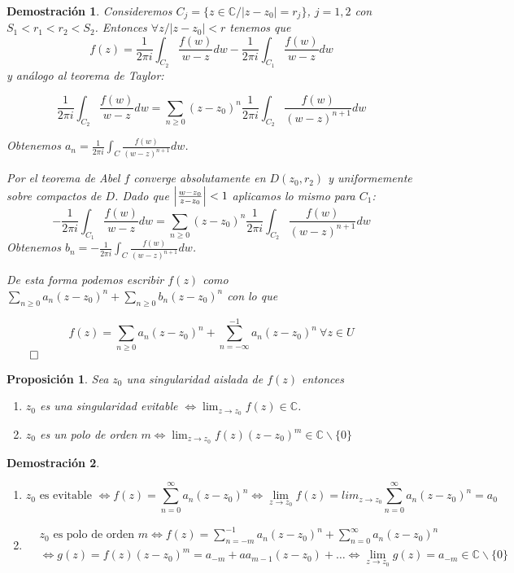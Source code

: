 \documentclass[10pt]{book}
\newtheorem{prop}{Proposición}[chapter]
\newtheorem*{dem}{Demostración}
\newcommand{\C}{\mathbb{C}}
\begin{document}
\begin{dem}
Consideremos $C_j = \{z\in\C / |z-z_0| = r_j\}$, $j= 1,2$ con $S_1 < r_1 < r_2 <S_2$.
Entonces $\forall z / |z-z_0|<r$ tenemos 	que 
$$f(z) = \frac{1}{2\pi i} \int_{C_2} \frac{f(w)}{w-z}dw - \frac{1}{2\pi i} \int_{C_1} \frac{f(w)}{w-z}dw$$
y análogo al teorema de Taylor:

$$\frac{1}{2\pi i} \int_{C_2} \frac{f(w)}{w-z}dw = \sum_{n\geq 0}(z-z_0)^n \frac{1}{2\pi i} \int_{C_2} \frac{f(w)}{(w-z)^{n+1}}dw$$

Obtenemos $a_n = \frac{1}{2\pi i}\int_C \frac{f(w)}{(w-z)^{n+1}}dw$.

Por el teorema de Abel $f$ converge absolutamente en $D(z_0,r_2)$ y uniformemente sobre compactos de $D$. Dado que $\left| \frac{w-z_0}{z-z_0}\right|<1$ aplicamos lo mismo para $C_1$:
$$-\frac{1}{2\pi i} \int_{C_1} \frac{f(w)}{w-z}dw = \sum_{n\geq 0}(z-z_0)^n \frac{1}{2\pi i} \int_{C_2} \frac{f(w)}{(w-z)^{n+1}}dw$$
Obtenemos $b_n = -\frac{1}{2\pi i}\int_C \frac{f(w)}{(w-z)^{n+1}}dw$.

De esta forma podemos escribir $f(z)$ como $\sum_{n\geq 0} a_n (z-z_0)^n +  \sum_{n\geq 0} b_n (z-z_0)^n$ con lo que 

$$f(z) = \sum_{n\geq 0} a_n (z-z_0)^n +  \sum_{n= -\infty}^{-1} a_n (z-z_0)^n\ \forall z\in U$$$\qed$
\end{dem}

\begin{prop}
Sea $z_0$ una singularidad aislada de $f(z)$ entonces 
\begin{enumerate}
\item $z_0$ es una singularidad evitable $\Leftrightarrow \lim_{z\to z_0} f(z) \in\C$.
\item $z_0$ es un polo de orden $m \Leftrightarrow \lim_{z\to z_0} f(z)(z-z_0)^m \in \C\backslash\{0\}$
\end{enumerate}
\end{prop}

\begin{dem}
\begin{enumerate}
\item $$z_0 \text{ es evitable } \Leftrightarrow f(z) = \sum_{n=0}^{\infty} a_n (z-z_0)^n \Leftrightarrow \lim_{z\to z_0} f(z) = lim_{z\to z_0} \sum_{n=0}^\infty a_n (z-z_0)^n = a_0$$

\item \begin{align*}
& z_0 \text{ es polo de orden } m \Leftrightarrow f(z) = \sum_{n=-m}^{-1} a_n(z-z_0)^n + \sum_{n=0}^\infty a_n (z-z_0)^n\\
& \Leftrightarrow g(z) = f(z)(z-z_0)^m = a_{-m} + aa_{m-1}(z-z_0)+\ldots \Leftrightarrow \lim_{z\to z_0} g(z) = a_{-m}\in \C\backslash\{0\}
\end{align*}
\end{enumerate}
\end{dem}
\end{document}
